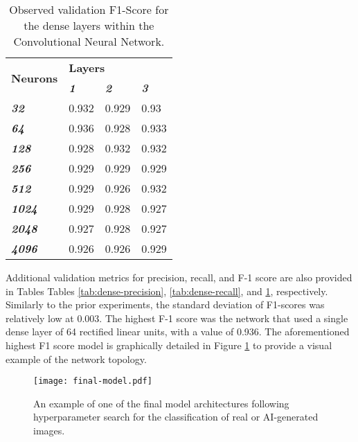 \documentclass{article}
\begin{document}
\begin{table}[] \footnotesize
\centering
\caption{Observed validation F1-Score for the dense layers within the Convolutional Neural Network.}
\label{tab:dense-f1}
\begin{tabular}{@{}llll@{}}
\toprule
\multirow{2}{*}{\textbf{Neurons}} & \multicolumn{3}{l}{\textbf{Layers}}                             \\ \cmidrule(l){2-4} 
                                  & \textit{\textbf{1}} & \textit{\textbf{2}} & \textit{\textbf{3}} \\ \cmidrule(r){1-1}
\textit{\textbf{32}}              & 0.932               & 0.929               & 0.93                \\
\textit{\textbf{64}}              & 0.936               & 0.928               & 0.933               \\
\textit{\textbf{128}}             & 0.928               & 0.932               & 0.932               \\
\textit{\textbf{256}}             & 0.929               & 0.929               & 0.929               \\
\textit{\textbf{512}}             & 0.929               & 0.926               & 0.932               \\
\textit{\textbf{1024}}            & 0.929               & 0.928               & 0.927               \\
\textit{\textbf{2048}}            & 0.927               & 0.928               & 0.927               \\
\textit{\textbf{4096}}            & 0.926               & 0.926               & 0.929               \\ \bottomrule
\end{tabular}
\end{table}

Additional validation metrics for precision, recall, and F-1 score are also provided in Tables Tables \ref{tab:dense-precision}, \ref{tab:dense-recall}, and \ref{tab:dense-f1}, respectively. Similarly to the prior experiments, the standard deviation of F1-scores was relatively low at 0.003. The highest F-1 score was the network that used a single dense layer of 64 rectified linear units, with a value of 0.936. 
The aforementioned highest F1 score model is graphically detailed in Figure \ref{fig:final-model} to provide a visual example of the network topology. 

\begin{figure}
    \centering
    \texttt{[image: final-model.pdf]}
    \caption{An example of one of the final model architectures following hyperparameter search for the classification of real or AI-generated images.}
    \label{fig:final-model}
\end{figure}
\end{document}
